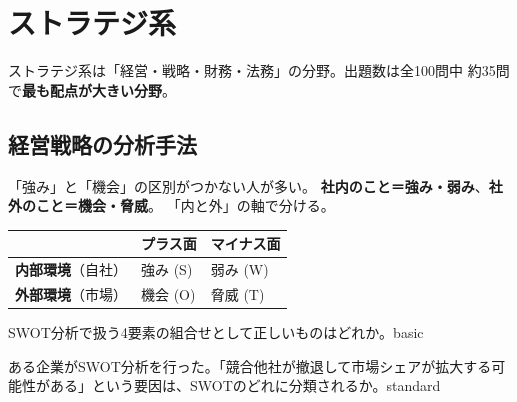 \chapter{ストラテジ系}

ストラテジ系は「経営・戦略・財務・法務」の分野。出題数は全100問中 約35問で\textbf{最も配点が大きい分野}。

\section{経営戦略の分析手法}

\mondaipage
{}

\begin{stumble}
「強み」と「機会」の区別がつかない人が多い。
\textbf{社内のこと＝強み・弱み}、\textbf{社外のこと＝機会・脅威}。
「内と外」の軸で分ける。
\end{stumble}

\begin{center}
\begin{tabularx}{\textwidth}{lXX}
  \toprule
  & \textbf{プラス面} & \textbf{マイナス面} \\
  \midrule
  \textbf{内部環境}（自社） & 強み (S) & 弱み (W) \\
  \textbf{外部環境}（市場） & 機会 (O) & 脅威 (T) \\
  \bottomrule
\end{tabularx}
\end{center}


\begin{mondai}{SWOT分析で扱う4要素の組合せとして正しいものはどれか。}{basic}
\end{mondai}

\begin{mondai}{ある企業がSWOT分析を行った。「競合他社が撤退して市場シェアが拡大する可能性がある」という要因は、SWOTのどれに分類されるか。}{standard}
\end{mondai}

